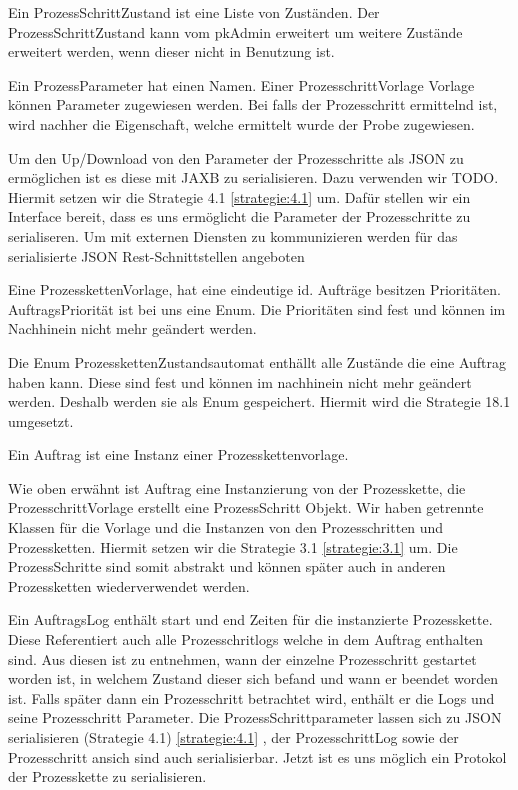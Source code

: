 \documentclass[enabledeprecatedfontcommands,fontsize=12pt,paper=a4,twoside]{scrartcl}
\begin{document}
{Ein ProzessSchrittZustand ist eine Liste von Zuständen. Der
ProzessSchrittZustand kann vom pkAdmin erweitert um weitere Zustände erweitert
werden, wenn dieser nicht in Benutzung ist.

Ein ProzessParameter hat einen Namen. Einer ProzesschrittVorlage Vorlage können
Parameter zugewiesen werden. Bei falls der Prozesschritt ermittelnd ist, wird
nachher die Eigenschaft, welche ermittelt wurde der Probe zugewiesen.

Um den Up/Download von den Parameter der Prozesschritte als JSON zu ermöglichen
ist es diese mit JAXB zu serialisieren. Dazu verwenden wir
TODO. Hiermit setzen wir die Strategie 4.1 \ref{strategie:4.1}  um. Dafür stellen wir ein Interface
bereit, dass es uns ermöglicht die Parameter der Prozesschritte zu serialiseren.
Um mit externen Diensten zu kommunizieren werden für das serialisierte JSON
Rest-Schnittstellen angeboten

Eine ProzesskettenVorlage, hat eine eindeutige id. Aufträge besitzen
Prioritäten. AuftragsPriorität ist bei uns eine Enum. Die Prioritäten sind fest
und können im Nachhinein nicht mehr geändert werden.


Die Enum ProzesskettenZustandsautomat enthällt alle Zustände die eine Auftrag
haben kann. Diese sind fest und können im nachhinein nicht mehr geändert werden.
Deshalb werden sie als Enum gespeichert. Hiermit wird die Strategie 18.1 umgesetzt.

Ein Auftrag ist eine Instanz einer Prozesskettenvorlage.

Wie oben erwähnt ist Auftrag eine Instanzierung von der Prozesskette, die
ProzesschrittVorlage erstellt eine ProzessSchritt Objekt. Wir haben getrennte
Klassen für die Vorlage und die Instanzen von den Prozesschritten und Prozessketten.
Hiermit setzen wir die Strategie 3.1 \ref{strategie:3.1}  um. Die ProzessSchritte sind somit abstrakt
und können später auch in anderen Prozessketten wiederverwendet werden.

Ein AuftragsLog enthält start und end Zeiten für die instanzierte Prozesskette.
Diese Referentiert auch alle Prozesschritlogs welche in dem Auftrag enthalten
sind. Aus diesen ist zu entnehmen, wann der einzelne Prozesschritt gestartet
worden ist, in welchem Zustand dieser sich befand und wann er beendet worden
ist. Falls später dann ein Prozesschritt betrachtet wird, enthält er die Logs
und seine Prozesschritt Parameter. Die ProzessSchrittparameter lassen sich zu
JSON serialisieren (Strategie 4.1) \ref{strategie:4.1} , der ProzesschrittLog sowie der Prozesschritt
ansich sind auch serialisierbar. Jetzt ist es uns möglich ein Protokol
der Prozesskette zu serialisieren.


}
\end{document}
